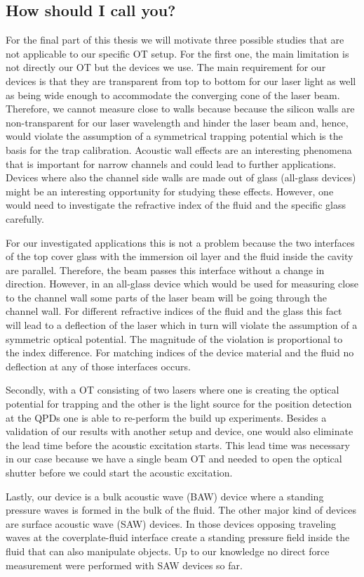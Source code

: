 \subsection{How should I call you?}

For the final part of this thesis we will motivate three possible studies that 
are not applicable to our specific OT setup. For the first one, the main 
limitation is not directly our OT but the devices we use. The main requirement 
for our devices is that they are transparent from top to bottom for our laser 
light as well as being wide enough to accommodate the converging cone of the 
laser beam. Therefore, we cannot measure close to walls because because the 
silicon walls are non-transparent for our laser wavelength and hinder the laser 
beam and, hence, would violate the assumption of a symmetrical trapping 
potential which is the basis for the trap calibration. Acoustic wall effects 
are an interesting phenomena that is important for narrow channels and could 
lead to further applications. Devices where also the channel side walls are 
made out of glass (all-glass devices) might be an interesting opportunity for 
studying these effects. However, one would need to investigate the refractive 
index of the fluid and the specific glass carefully.

For our investigated applications this is not a problem because the two 
interfaces of the top cover glass with the immersion oil layer and the fluid 
inside the cavity are parallel. Therefore, the beam passes this interface 
without a change in direction. However, in an all-glass device which would be 
used for measuring close to the channel wall some parts of the laser beam will 
be going through the channel wall. For different refractive indices of the 
fluid and the glass this fact will lead to a deflection of the laser which in 
turn will violate the assumption of a symmetric optical potential. The 
magnitude of the violation is proportional to the index difference. For 
matching indices of the device material and the fluid no deflection at any of 
those interfaces occurs.

Secondly, with a OT consisting of two lasers where one is creating the optical 
potential for trapping and the other is the light source for the position 
detection at the QPDs one is able to re-perform the build up experiments. 
Besides a validation of our results with another setup and device, one would 
also eliminate the lead time before the acoustic excitation starts. This lead 
time was necessary in our case because we have a single beam OT and needed to 
open the optical shutter before we could start the acoustic excitation.

Lastly, our device is a bulk acoustic wave (BAW) device where a standing 
pressure waves is formed in the bulk of the fluid. The other major kind of 
devices are surface acoustic wave (SAW) devices. In those devices opposing 
traveling waves at the coverplate-fluid interface create a standing pressure 
field inside the fluid that can also manipulate objects. Up to our knowledge no 
direct force measurement were performed with SAW devices so far.
